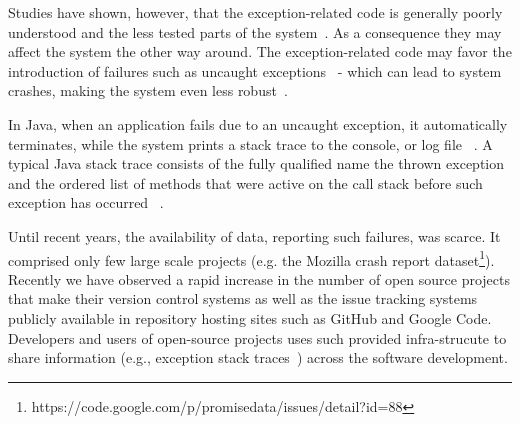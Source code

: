 \documentclass[conference]{IEEEtran}
\begin{document}
Studies have shown, however, that the exception-related code is generally poorly understood and the
 less tested parts of the system~\cite{miller1997issues,Robil00,shah2010understanding, 
garcia2007extracting,garcia2001comparative,cabral2007exception,coelho2011unveiling}.
As a consequence they may affect the system the other way around.
The exception-related code may favor the introduction of failures such as 
uncaught exceptions~\cite{jo2004uncaught, zhang2012amplifying} - 
which can lead to system crashes, making the system even less robust~\cite{coelho2011unveiling}.

In Java, when an application fails due to an uncaught exception, 
it automatically terminates, while the system prints a stack trace to the console, 
or log file ~\cite{gosling2000java}.  A typical Java stack trace consists of  the fully qualified name 
the thrown exception and the ordered list of methods that were active on the call stack before 
such exception has occurred ~\cite{gosling2000java,bloch2008effective}.

Until recent years, the availability of data, reporting such failures, was scarce. 
It comprised only few large scale projects (e.g. the Mozilla crash report dataset\footnote{https://code.google.com/p/promisedata/issues/detail?id=88}).
Recently we have observed a rapid increase in the number of open
source projects that make their version control systems as well as the issue tracking systems
publicly available in repository hosting sites such as GitHub and Google Code.
Developers and users of open-source projects uses such provided
 infra-strucute to share information (e.g., exception stack traces~\cite{bettenburg2008makes,schroter2010stack}) across 
the software development.

\end{document}
